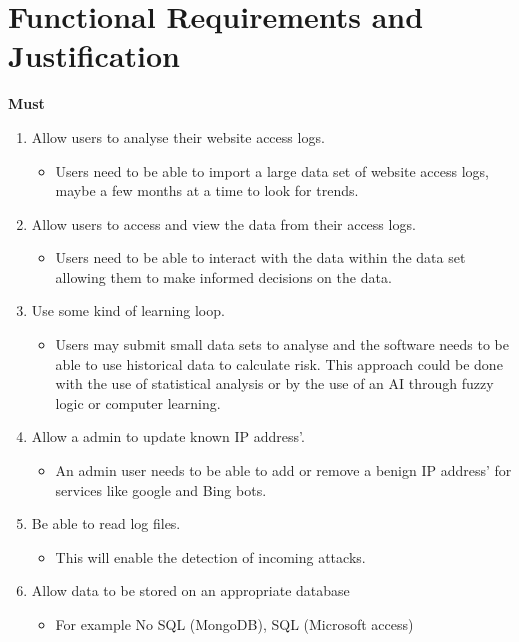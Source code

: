 
\section{Functional Requirements and Justification}
\textbf{Must}
\begin{enumerate}
    \item Allow users to analyse their website access logs.
    \begin{itemize}
        \item Users need to be able to import a large data set of website access logs, maybe a few months at a time to look for trends.
    \end{itemize}
    \item Allow users to access and view the data from their access logs.
    \begin{itemize}
        \item Users need to be able to interact with the data within the data set allowing them to make informed decisions on the data.
    \end{itemize}
    \item Use some kind of learning loop.
    \begin{itemize}
        \item Users may submit small data sets to analyse and the software needs to be able to use historical data to calculate risk. This approach could be done with the use of statistical analysis or by the use of an AI through fuzzy logic or computer learning.
    \end{itemize}
    \item Allow a admin to update known IP address'.
    \begin{itemize}
        \item An admin user needs to be able to add or remove a benign IP address' for services like google and Bing bots.
    \end{itemize}
    \item Be able to read log files.
    \begin{itemize}
        \item This will enable the detection of incoming attacks.
    \end{itemize}
        \item Allow data to be stored on an appropriate database
    \begin{itemize}
        \item For example  No SQL (MongoDB), SQL (Microsoft access)

\end{itemize}
\end{enumerate}
